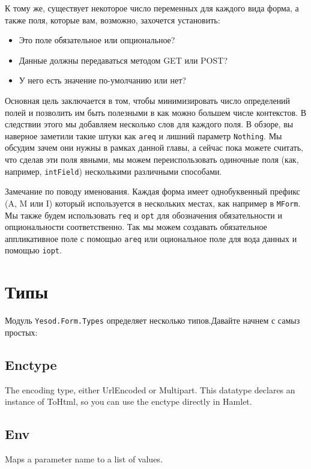 К тому же, существует некоторое число переменных для каждого вида форма, а также поля,
которые вам, возможно, захочется установить:
\begin{itemize}
\item Это поле обязательное или опциональное?
\item Данные должны передаваться методом GET или POST?
\item У него есть значение по-умолчанию или нет?
\end{itemize}

Основная цель заключается в том, чтобы минимизировать число определений полей и позволить
им быть полезными в как можно большем числе контекстов. В следствии этого мы добавляем
несколько слов для каждого поля. В обзоре, вы наверное заметили такие штуки как
\lstinline'areq' и лишний параметр \lstinline'Nothing'. Мы обсудим зачем они нужны в
рамках данной главы, а сейчас пока можете считать, что сделав эти поля явными, мы можем
переиспользовать одиночные поля (как, например, \lstinline'intField') несколькими
различными способами.

Замечание по поводу именования. Каждая форма имеет однобуквенный префикс (A, M или I)
который используется в нескольких местах, как например в \lstinline'MForm'. Мы также
будем использовать \lstinline'req' и \lstinline'opt' для обозначения обязательности и
опциональности соответственно. Так мы можем создавать обязательное аппликативное поле с
помощью \lstinline'areq' или оциональное поле для вода данных и помощью \lstinline'iopt'.

\section{Типы}

Модуль \lstinline'Yesod.Form.Types' определяет несколько типов.Давайте начнем с самыз
простых:

\subsection{Enctype}

The encoding type, either UrlEncoded or Multipart. This datatype declares an instance of
ToHtml, so you can use the enctype directly in Hamlet.

\subsection{Env}

Maps a parameter name to a list of values.

